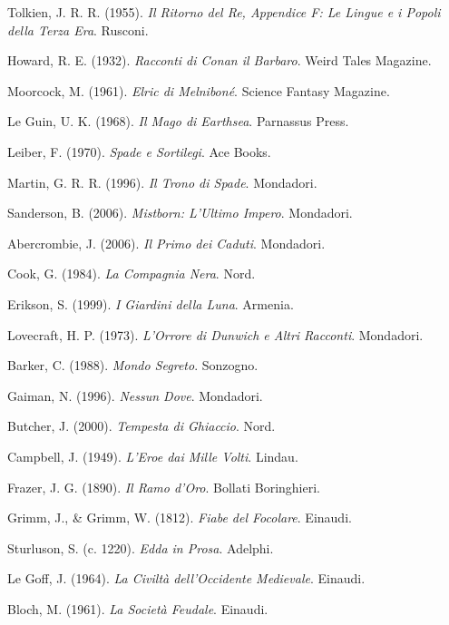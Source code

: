 Tolkien, J. R. R. (1955).
\textit{Il Ritorno del Re, Appendice F: Le Lingue e i Popoli della Terza Era}.
Rusconi.

Howard, R. E. (1932).
\textit{Racconti di Conan il Barbaro}.
Weird Tales Magazine.

Moorcock, M. (1961).
\textit{Elric di Melniboné}.
Science Fantasy Magazine.

Le Guin, U. K. (1968).
\textit{Il Mago di Earthsea}.
Parnassus Press.

Leiber, F. (1970).
\textit{Spade e Sortilegi}.
Ace Books.

Martin, G. R. R. (1996).
\textit{Il Trono di Spade}.
Mondadori.

Sanderson, B. (2006).
\textit{Mistborn: L'Ultimo Impero}.
Mondadori.

Abercrombie, J. (2006).
\textit{Il Primo dei Caduti}.
Mondadori.

Cook, G. (1984).
\textit{La Compagnia Nera}.
Nord.

Erikson, S. (1999).
\textit{I Giardini della Luna}.
Armenia.

Lovecraft, H. P. (1973).
\textit{L'Orrore di Dunwich e Altri Racconti}.
Mondadori.

Barker, C. (1988).
\textit{Mondo Segreto}.
Sonzogno.

Gaiman, N. (1996).
\textit{Nessun Dove}.
Mondadori.

Butcher, J. (2000).
\textit{Tempesta di Ghiaccio}.
Nord.

Campbell, J. (1949).
\textit{L'Eroe dai Mille Volti}.
Lindau.

Frazer, J. G. (1890).
\textit{Il Ramo d'Oro}.
Bollati Boringhieri.

Grimm, J., \& Grimm, W. (1812).
\textit{Fiabe del Focolare}.
Einaudi.

Sturluson, S. (c. 1220).
\textit{Edda in Prosa}.
Adelphi.

Le Goff, J. (1964).
\textit{La Civiltà dell'Occidente Medievale}.
Einaudi.

Bloch, M. (1961).
\textit{La Società Feudale}.
Einaudi.

